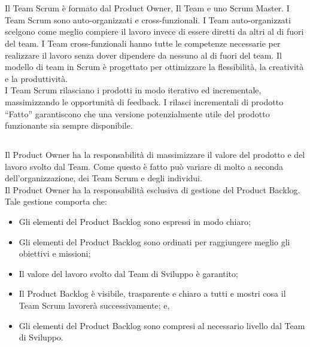 
\section*{\color{Blue}{Scrum Team}}%
\label{sec:team}
Il Team Scrum \`e formato dal Product Owner, Il Team e uno Scrum Master. I Team  Scrum sono auto-organizzati e 
cross-funzionali. I Team auto-organizzati scelgono come meglio compiere il lavoro invece di essere diretti da altri al di fuori 
del team. I Team cross-funzionali hanno tutte le competenze necessarie per realizzare il lavoro senza dover dipendere da 
nessuno al di fuori del team. Il modello di team in Scrum \`e progettato per ottimizzare la flessibilità, la creativit\`a e la 
produttivit\`a. \newline
\\I Team Scrum rilasciano i prodotti in modo iterativo ed incrementale, massimizzando le opportunit\`a di feedback. I rilasci 
incrementali di prodotto ``Fatto'' garantiscono che una versione potenzialmente utile del prodotto funzionante sia sempre 
disponibile.

\subsection*{\color{SteelBlue}{Il Product Owner}}%
\label{sec:productowner}
Il Product Owner ha la responsabilit\`a  di massimizzare il valore del prodotto e del lavoro svolto dal Team. Come questo \`e 
fatto pu\`o variare di molto a seconda dell'organizzazione, dei Team Scrum e degli individui. \newline 
\\Il Product Owner ha la responsabilit\`a esclusiva di gestione del Product Backlog. Tale gestione comporta che:

\begin{itemize}
	\item Gli elementi del Product Backlog sono espressi in modo chiaro;
	\item Gli elementi del Product Backlog sono ordinati per raggiungere meglio gli obiettivi e missioni;
	\item Il valore del lavoro svolto dal Team di Sviluppo \`e garantito;
	\item Il Product Backlog \`e visibile, trasparente e chiaro a tutti e mostri cosa il Team Scrum lavorerà 
	successivamente; e,
	\item Gli elementi del Product Backlog sono compresi al necessario livello dal Team di Sviluppo.
\end{itemize}

